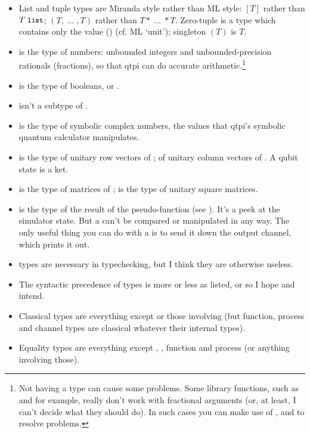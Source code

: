 \begin{itemize}
\item List and tuple types are Miranda style rather than ML style: $[T]$ rather than $T\;\texttt{\small{}list}$; $(T,\;...\;,T)$ rather than $T*\;...\;*T$. Zero-tuple is a type which contains only the value () (cf. ML `unit'); singleton $(T)$ is $T$.
\item {} is the type of numbers: unbounded integers and unbounded-precision rationals (fractions), so that qtpi can do accurate arithmetic.\footnote{Not having a type  can cause some problems. Some library functions, such as  and  for example, really don't work with fractional arguments (or, at least, I can't decide what they should do). In such cases you can make use of ,  and  to resolve problems.}
\item {} is the type of booleans,  or .
\item {} isn't a subtype of .
\item {} is the type of symbolic complex numbers, the values that qtpi's symbolic quantum calculator manipulates.
\item {} is the type of unitary row vectors of ;  of unitary column vectors of . A qubit state is a ket.
\item {}  is the type of matrices of ;  is the type of unitary square matrices.
\item {}  is the type of the result of the  pseudo-function (see ). It's a peek at the simulator state. But a  can't be compared or manipulated in any way. The only useful thing you can do with a   is to send it down the  output channel, which prints it out.
\item {} types are necessary in typechecking, but I think they are otherwise useless.
\item The syntactic precedence of types is more or less as listed, or so I hope and intend. 
\item Classical types are everything except   or those involving   (but function, process and channel types are classical whatever their internal types).  
\item Equality types are everything except ,  , function and process (or anything involving those).  

\end{itemize}
